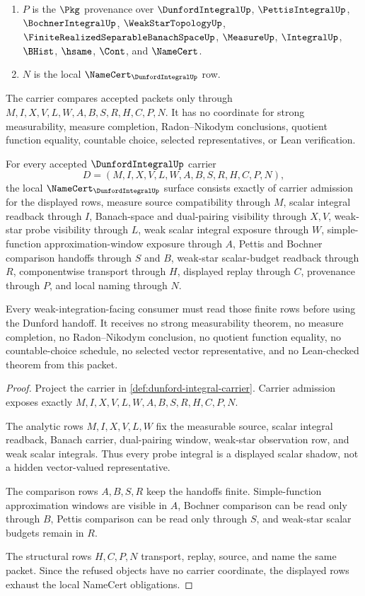 \begin{definition}
\begin{enumerate}
\item $P$ is the $\Pkg$ provenance over $\DunfordIntegralUp$, $\PettisIntegralUp$, $\BochnerIntegralUp$, $\WeakStarTopologyUp$, $\FiniteRealizedSeparableBanachSpaceUp$, $\MeasureUp$, $\IntegralUp$, $\BHist$, $\hsame$, $\Cont$, and $\NameCert$.
\item $N$ is the local $\NameCert_{\DunfordIntegralUp}$ row.
\end{enumerate}
The carrier compares accepted packets only through $M,I,X,V,L,W,A,B,S,R,H,C,P,N$. It has no coordinate for strong measurability, measure completion, Radon--Nikodym conclusions, quotient function equality, countable choice, selected representatives, or Lean verification.
\end{definition}

\begin{theorem}
\label{thm:dunford-integral-namecert-obligations}
For every accepted $\DunfordIntegralUp$ carrier
$$
D=(M,I,X,V,L,W,A,B,S,R,H,C,P,N),
$$
the local $\NameCert_{\DunfordIntegralUp}$ surface consists exactly of carrier admission for the displayed rows, measure source compatibility through $M$, scalar integral readback through $I$, Banach-space and dual-pairing visibility through $X,V$, weak-star probe visibility through $L$, weak scalar integral exposure through $W$, simple-function approximation-window exposure through $A$, Pettis and Bochner comparison handoffs through $S$ and $B$, weak-star scalar-budget readback through $R$, componentwise transport through $H$, displayed replay through $C$, provenance through $P$, and local naming through $N$.

Every weak-integration-facing consumer must read those finite rows before using the Dunford handoff. It receives no strong measurability theorem, no measure completion, no Radon--Nikodym conclusion, no quotient function equality, no countable-choice schedule, no selected vector representative, and no Lean-checked theorem from this packet.
\end{theorem}
\begin{proof}
Project the carrier in \autoref{def:dunford-integral-carrier}. Carrier admission exposes exactly $M,I,X,V,L,W,A,B,S,R,H,C,P,N$.

The analytic rows $M,I,X,V,L,W$ fix the measurable source, scalar integral readback, Banach carrier, dual-pairing window, weak-star observation row, and weak scalar integrals. Thus every probe integral is a displayed scalar shadow, not a hidden vector-valued representative.

The comparison rows $A,B,S,R$ keep the handoffs finite. Simple-function approximation windows are visible in $A$, Bochner comparison can be read only through $B$, Pettis comparison can be read only through $S$, and weak-star scalar budgets remain in $R$.

The structural rows $H,C,P,N$ transport, replay, source, and name the same packet. Since the refused objects have no carrier coordinate, the displayed rows exhaust the local NameCert obligations.
\end{proof}

